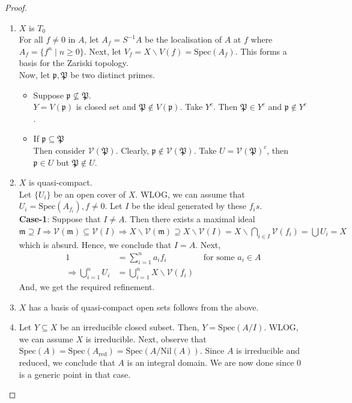 \documentclass[oneside, 12pt]{scrbook}
\newcommand{\V}{\mathcal{V}}
\newcommand{\spec}{\mathrm{Spec}}
\newcommand{\pr}{\mathfrak{p}}
\newcommand{\m}{\mathfrak{m}}
\newcommand{\nil}{\mathrm{Nil}}
\theoremstyle{theorem}
\begin{document}
\begin{proof}
\begin{enumerate}
\item $X$ is $T_{0}$ \\
For all $f \neq 0$ in $A$,  let $A_{f} = S^{-1}A$ be the localisation of $A$ at $f$ where $A_{f} = \{f^n \mid n \geq 0\}$. Next, let $V_{f} = X \backslash V(f) = \spec (A_{f})$. This forms a basis for the Zariski topology. \\
Now, let $\pr, \mathfrak{P}$ be two distinct primes. 
\begin{itemize}
\item Suppose $\pr \not \subseteq \mathfrak{P}$. \\
$Y = V(\pr)$ is closed set and $\mathfrak{P} \not \in V(\pr)$. Take $Y^c$. Then $\mathfrak{P} \in Y^c$ and $\pr \not \in Y^c$. 
\item If $\pr \subseteq \mathfrak{P}$ \\
Then consider $\V(\mathfrak{P})$. Clearly, $\pr \not \in \V(\mathfrak{P})$. Take $U = \V(\mathfrak{P})^c$, then $\pr \in U$ but $\mathfrak{P} \not\in U$. 
\end{itemize}
\item $X$ is quasi-compact. \\
Let $\{U_{i}\}$ be an open cover of $X$. WLOG, we can assume that $U_{i} = \spec(A_{f_{i}}), f \neq 0$. Let $I$ be the ideal generated by these $f_{i}s$. \\
\textbf{Case-1}: Suppose that $I \neq A$. Then there exists a maximal ideal $\m \supseteq I \Rightarrow \V(\m) \subseteq \V(I) \Rightarrow X \backslash \V(\m) \supseteq X\backslash \V(I) = X \backslash \bigcap_{i \in I}\V(f_{i}) = \bigcup U_{i} = X$ which is absurd. Hence, we conclude that $I=A$. Next, 
\begin{align*}
1 &= \sum_{i=1}^n a_{i}f_{i} &\text{ for some } a_{i} \in A \\
\Rightarrow \bigcup_{i=1}^n U_{i} &= \bigcup_{i=1}^n X \backslash \V(f_{i})
\end{align*}
And, we get the required refinement. 
\item $X$ has a basis of quasi-compact open sets follows from the above.
\item Let $Y \subseteq X$ be an irreducible closed subset. Then, $Y = \spec(A/I)$. WLOG, we can assume $X$ is irreducible. Next, observe that $\spec(A) = \spec(A_{\mathrm{red}}) = \spec(A/ \nil(A))$. Since $A$ is irreducible and reduced, we conclude that $A$ is an integral domain. We are now done since $0$ is a generic point in that case.
\end{enumerate}
\end{proof}
\end{document}

